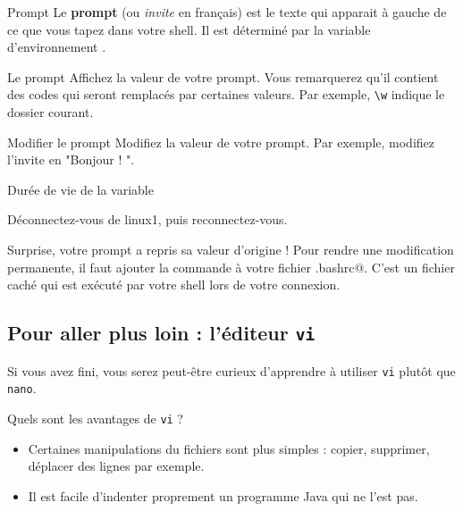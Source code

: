 \documentclass[a4paper,11pt]{style-esi/td}
\begin{document}
		\begin{theorie}{Prompt}
			Le \textbf{prompt} (ou \textit{invite} en français) 
			est le texte qui apparait à gauche
			de ce que vous tapez dans votre shell. 
			Il est déterminé par la variable d'environnement .
		\end{theorie}
			
		\begin{Experience}{Le prompt} 
			Affichez la valeur de votre prompt. 
			Vous remarquerez qu'il contient des codes qui seront 
			remplacés par certaines valeurs. 
			Par exemple, \verb_\w_ indique le dossier courant.
		\end{Experience}
			
		\begin{Exercice}{Modifier le prompt} 
			Modifiez la valeur de votre prompt.
			Par exemple, modifiez l'invite en "Bonjour ! ".
		\end{Exercice}	

		\begin{Tutoriel}{Durée de vie de la variable} 
			\vspace{-1em}
			\begin{steps}
			\item Déconnectez-vous de linux1, puis reconnectez-vous.	
			\end{steps}
			Surprise, votre prompt a repris sa valeur d'origine ! 
			Pour rendre une modification permanente, 
			il faut ajouter la commande à votre fichier \verb@.bashrc@.
			C'est un fichier caché qui est exécuté 
			par votre shell lors de votre connexion.
        \end{Tutoriel}

        \subsection{Pour aller plus loin : l'éditeur \texttt{vi}}
    
            Si vous avez fini,
            vous serez peut-être curieux d'apprendre à utiliser \texttt{vi}
            plutôt que \texttt{nano}.
    
            Quels sont les avantages de \texttt{vi} ?
            \begin{itemize}
            \item 
                Certaines manipulations du fichiers sont plus simples : 
                copier, supprimer, déplacer des lignes par exemple.
            \item 
                Il est facile d'indenter proprement un programme Java qui ne l'est pas.
            \end{itemize}
    
\end{document}
